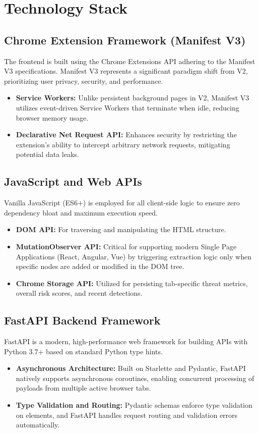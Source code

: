 \chapter{Technology Stack}

\section{Chrome Extension Framework (Manifest V3)}
The frontend is built using the Chrome Extensions API adhering to the Manifest V3 specifications. Manifest V3 represents a significant paradigm shift from V2, prioritizing user privacy, security, and performance. 
\begin{itemize}
    \item \textbf{Service Workers:} Unlike persistent background pages in V2, Manifest V3 utilizes event-driven Service Workers that terminate when idle, reducing browser memory usage.
    \item \textbf{Declarative Net Request API:} Enhances security by restricting the extension's ability to intercept arbitrary network requests, mitigating potential data leaks.
\end{itemize}

\section{JavaScript and Web APIs}
Vanilla JavaScript (ES6+) is employed for all client-side logic to ensure zero dependency bloat and maximum execution speed. 
\begin{itemize}
    \item \textbf{DOM API:} For traversing and manipulating the HTML structure.
    \item \textbf{MutationObserver API:} Critical for supporting modern Single Page Applications (React, Angular, Vue) by triggering extraction logic only when specific nodes are added or modified in the DOM tree.
    \item \textbf{Chrome Storage API:} Utilized for persisting tab-specific threat metrics, overall risk scores, and recent detections.
\end{itemize}

\section{FastAPI Backend Framework}
FastAPI is a modern, high-performance web framework for building APIs with Python 3.7+ based on standard Python type hints.
\begin{itemize}
    \item \textbf{Asynchronous Architecture:} Built on Starlette and Pydantic, FastAPI natively supports asynchronous coroutines, enabling concurrent processing of payloads from multiple active browser tabs.
    \item \textbf{Type Validation and Routing:} Pydantic schemas enforce type validation on elements, and FastAPI handles request routing and validation errors automatically.
\end{itemize}

